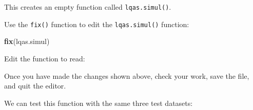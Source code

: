 \documentclass[12pt,a4paper]{book}
\newenvironment{Shaded}{\begin{snugshade}}{\end{snugshade}}
\newcommand{\ControlFlowTok}[1]{\textcolor[rgb]{0.13,0.29,0.53}{\textbf{#1}}}
\newcommand{\DataTypeTok}[1]{\textcolor[rgb]{0.13,0.29,0.53}{#1}}
\newcommand{\DecValTok}[1]{\textcolor[rgb]{0.00,0.00,0.81}{#1}}
\newcommand{\KeywordTok}[1]{\textcolor[rgb]{0.13,0.29,0.53}{\textbf{#1}}}
\newcommand{\NormalTok}[1]{#1}
\newcommand{\OperatorTok}[1]{\textcolor[rgb]{0.81,0.36,0.00}{\textbf{#1}}}
\newcommand{\StringTok}[1]{\textcolor[rgb]{0.31,0.60,0.02}{#1}}
\theoremstyle{definition}
\theoremstyle{definition}
\theoremstyle{definition}
\theoremstyle{remark}
\begin{document}
This creates an empty function called \texttt{lqas.simul()}.

Use the \texttt{fix()} function to edit the \texttt{lqas.simul()}
function:

\begin{Shaded}
\begin{Highlighting}[]
\KeywordTok{fix}\NormalTok{(lqas.simul)}
\end{Highlighting}
\end{Shaded}

Edit the function to read:

\begin{Shaded}
\end{Shaded}

Once you have made the changes shown above, check your work, save the
file, and quit the editor.

We can test this function with the same three test datasets:
\end{document}

